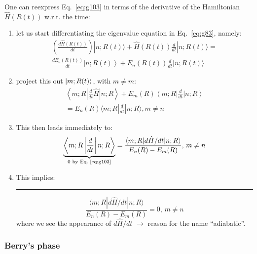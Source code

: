\documentclass[12pt]{article}
\newcommand{\be}{\begin{equation}}
\newcommand{\ee}{\end{equation}}
\begin{document}
One can reexpress  Eq.~\eqref{eq:g103} in terms of the derivative
of the Hamiltonian $\hat{H}(R(t))$ w.r.t. the time:
\begin{enumerate}
\item let us start differentiating the eigenvalue
equation in Eq.~\eqref{eq:g83}, namely:
\be
\begin{gathered}
\left(\frac{d \hat{H}(R(t))}{d t}\right)|n ; R(t)\rangle+\hat{H}(R(t)) \frac{d}{d t}|n ; R(t)\rangle= \\ 
\frac{d E_{n}(R(t))}{d t}\left|n ; R(t)\right\rangle+E_{n}(R(t)) \frac{d}{d t}|n ; R(t)\rangle
\end{gathered}
\ee
%
\item project this out $\ket{m;R(t)}$, with $ m\neq m$:
\be
\begin{gathered}
\left\langle m ; R\left|\frac{d}{d t} \hat{H}\right| n ; R\right\rangle+E_{m}(R)\left\langle m ; R\right| \frac{d}{d t}\left| n ; R\right\rangle \\ 
=E_{n}(R)\langle m ; R| \frac{d}{d t}|n ; R\rangle, m \neq n 
\end{gathered}
\ee
\item This then leads immediately to:
\be
\underbrace{\left\langle m ; R\left|\frac{d}{d t}\right| n ; R\right\rangle}%
_{0\text{ by Eq.~\eqref{eq:g103}}}
=\frac{\langle m ; R|d \hat{H} / d t| n ; R\rangle}{E_{n}(R)-E_{m}(R)},\,m \neq n
\ee
%
\item This implies:\\
\rule{\textwidth}{1pt}
\be
\frac{\langle m ; R|d \hat{H} / d t| n ; R\rangle}{E_{n}(R)-E_{m}(R)} = 0,\,m \neq n
\label{eq:g108}
\ee
where we see the appearance of $d \hat{H} / d t$ $\rightarrow$ reason for the name ``adiabatic''.
\end{enumerate}

\subsubsection{Berry's phase}
\end{document}
